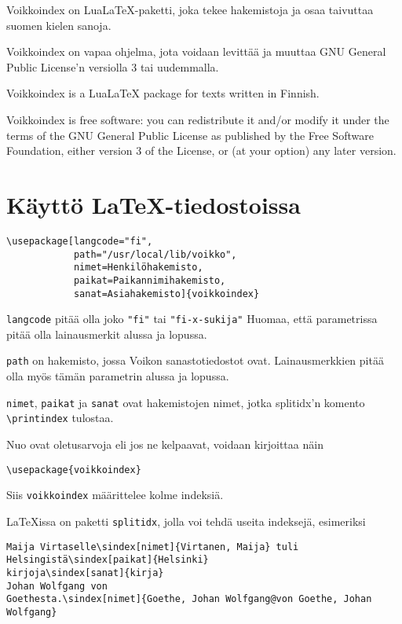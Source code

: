 \documentclass[12pt]{article}
\begin{document}
\pagestyle{fancy}
\setlength{\parindent}{0pt}
\setlength{\parskip}{1ex plus 0.5ex minus 0.2ex}

Voikkoindex on LuaLaTeX-paketti, joka tekee hakemistoja ja osaa
taivuttaa suomen kielen sanoja.

Voikkoindex on vapaa ohjelma, jota voidaan levittää ja muuttaa GNU
General Public License'n versiolla 3 tai uudemmalla.


Voikkoindex is a LuaLaTeX package for texts written in Finnish.

Voikkoindex is free software: you can redistribute it and/or modify it
under the terms of the GNU General Public License as published by the
Free Software Foundation, either version 3 of the License, or (at your
option) any later version.



\section*{Käyttö LaTeX-tiedostoissa}

\begin{verbatim}
\usepackage[langcode="fi",
            path="/usr/local/lib/voikko",
            nimet=Henkilöhakemisto,
            paikat=Paikannimihakemisto,
            sanat=Asiahakemisto]{voikkoindex}
\end{verbatim}

\verb=langcode= pitää olla joko \verb="fi"= tai \verb="fi-x-sukija"=
Huomaa, että parametrissa pitää olla lainausmerkit alussa ja lopussa.

\verb=path= on hakemisto, jossa Voikon sanastotiedostot ovat.
Lainausmerkkien pitää olla myös tämän parametrin alussa ja lopussa.

\verb=nimet=, \verb=paikat= ja \verb=sanat= ovat hakemistojen nimet,
jotka splitidx'n komento \verb=\printindex= tulostaa.

Nuo ovat oletusarvoja eli jos ne kelpaavat, voidaan kirjoittaa näin

\begin{verbatim}
\usepackage{voikkoindex}
\end{verbatim}

Siis \verb=voikkoindex= määrittelee kolme indeksiä.


\bigskip
LaTeXissa on paketti \verb=splitidx=, jolla voi tehdä useita
indeksejä, esimeriksi

\begin{verbatim}
Maija Virtaselle\sindex[nimet]{Virtanen, Maija} tuli
Helsingistä\sindex[paikat]{Helsinki}
kirjoja\sindex[sanat]{kirja}
Johan Wolfgang von
Goethesta.\sindex[nimet]{Goethe, Johan Wolfgang@von Goethe, Johan Wolfgang}
\end{verbatim}
\end{document}
